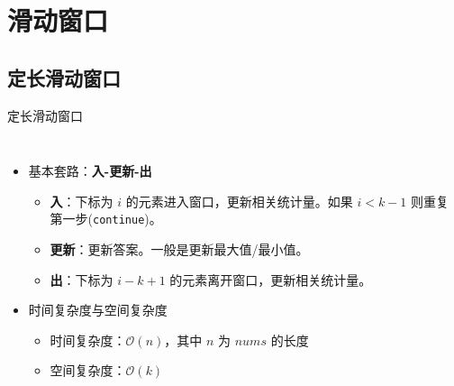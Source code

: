

\section{滑动窗口}

\subsection{定长滑动窗口}

\begin{frame}[fragile]{定长滑动窗口}
  \begin{columns}[T]
    \begin{itemize}
      \item 基本套路：\textbf{入-更新-出}
            \begin{itemize}
              \item \textbf{入}：下标为 $i$ 的元素进入窗口，更新相关统计量。如果 $i<k−1$ 则重复第一步(\lstinline{continue})。
              \item \textbf{更新}：更新答案。一般是更新最大值/最小值。
              \item \textbf{出}：下标为 $i−k+1$ 的元素离开窗口，更新相关统计量。
            \end{itemize}
      \item 时间复杂度与空间复杂度
            \begin{itemize}
              \item 时间复杂度：$\mathcal{O}(n)$，其中 $n$ 为 $nums$ 的长度
              \item 空间复杂度：$\mathcal{O}(k)$
            \end{itemize}
    \end{itemize}

  \end{columns}
\end{frame}


